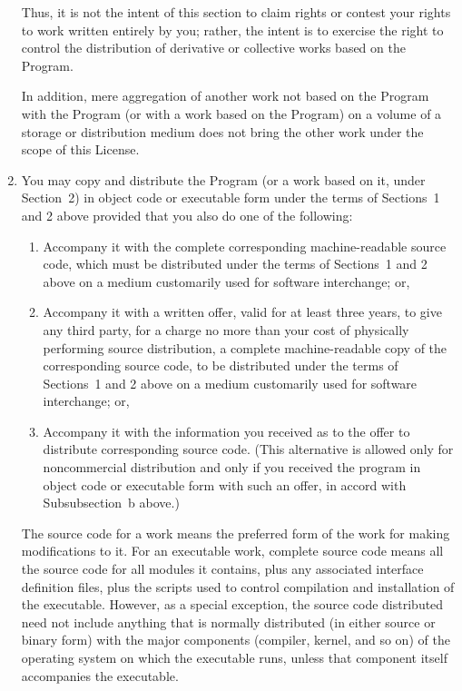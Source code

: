 \begin{enumerate}
        Thus, it is not the intent of this section to claim rights or contest
        your rights to work written entirely by you; rather, the intent is to
        exercise the right to control the distribution of derivative or
        collective works based on the Program.

        In addition, mere aggregation of another work not based on the
        Program with the Program (or with a work based on the Program) on a
        volume of a storage or distribution medium does not bring the other
        work under the scope of this License.
    \item You may copy and distribute the Program (or a work based on it,
        under Section~2) in object code or executable form under the terms of
        Sections~1 and 2 above provided that you also do one of the
        following:
        \begin{enumerate}
            \item Accompany it with the complete corresponding
                machine-readable source code, which must be distributed
                under the terms of Sections~1 and 2 above on a medium
                customarily used for software interchange; or,
            \item Accompany it with a written offer, valid for at least
                three years, to give any third party, for a charge no more
                than your cost of physically performing source
                distribution, a complete machine-readable copy of the
                corresponding source code, to be distributed under the
                terms of Sections~1 and 2 above on a medium customarily
                used for software interchange; or,
            \item Accompany it with the information you received as to the
                offer to distribute corresponding source code.  (This
                alternative is allowed only for noncommercial distribution
                and only if you received the program in object code or
                executable form with such an offer, in accord with
                Subsubsection~b above.)
        \end{enumerate}
        The source code for a work means the preferred form of the work for
        making modifications to it.  For an executable work, complete source
        code means all the source code for all modules it contains, plus any
        associated interface definition files, plus the scripts used to
        control compilation and installation of the executable.  However, as
        a special exception, the source code distributed need not include
        anything that is normally distributed (in either source or binary
        form) with the major components (compiler, kernel, and so on) of the
        operating system on which the executable runs, unless that component
        itself accompanies the executable.


\end{enumerate}
